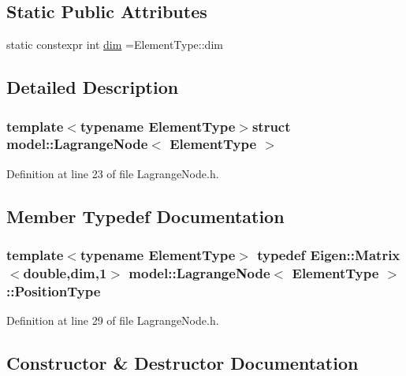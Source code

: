 \subsection*{Static Public Attributes}
\begin{DoxyCompactItemize}
\item 
static constexpr int \hyperlink{structmodel_1_1_lagrange_node_ac81c9fed45284ea37402810157ee82d3}{dim} =Element\+Type\+::dim
\end{DoxyCompactItemize}


\subsection{Detailed Description}
\subsubsection*{template$<$typename Element\+Type$>$struct model\+::\+Lagrange\+Node$<$ Element\+Type $>$}



Definition at line 23 of file Lagrange\+Node.\+h.



\subsection{Member Typedef Documentation}
\hypertarget{structmodel_1_1_lagrange_node_ab10f4c4ce2d9ceba42ceae31c4a0b7e8}{}
\subsubsection[{Position\+Type}]{\setlength{\rightskip}{0pt plus 5cm}template$<$typename Element\+Type$>$ typedef Eigen\+::\+Matrix$<$double,{\bf dim},1$>$ {\bf model\+::\+Lagrange\+Node}$<$ Element\+Type $>$\+::{\bf Position\+Type}}\label{structmodel_1_1_lagrange_node_ab10f4c4ce2d9ceba42ceae31c4a0b7e8}


Definition at line 29 of file Lagrange\+Node.\+h.



\subsection{Constructor \& Destructor Documentation}
\hypertarget{structmodel_1_1_lagrange_node_a61edc8f3da49123b8a0e1e23bcc88b08}{}

